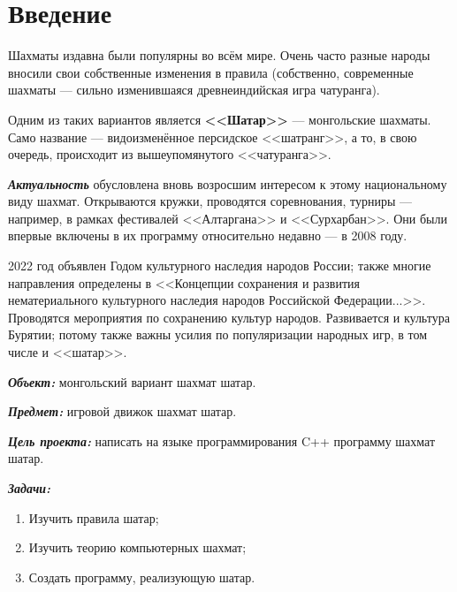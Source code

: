 {
	\chapter*{Введение}
	Шахматы издавна были популярны во всём мире. Очень часто разные народы вносили свои собственные изменения в правила (собственно, современные шахматы --- сильно изменившаяся древнеиндийская игра чатуранга). 
	
	Одним из таких вариантов является \textbf{<<Шатар>>} --- монгольские шахматы. Само название --- видоизменённое персидское <<шатранг>>, а то, в свою очередь, происходит из вышеупомянутого <<чатуранга>>.
	
	\textbf{\textit{Актуальность}} обусловлена вновь возросшим интересом к этому национальному виду шахмат. Открываются кружки, проводятся соревнования, турниры --- например, в рамках фестивалей <<Алтаргана>> и <<Сурхарбан>>. Они были впервые включены в их программу относительно недавно --- в 2008 году.
	
	2022 год  объявлен Годом культурного наследия народов России; также многие направления определены в <<Концепции
	сохранения и развития нематериального культурного наследия народов Российской Федерации...>>. Проводятся мероприятия по сохранению культур народов. Развивается и культура Бурятии; потому  также важны  усилия по популяризации народных игр, в том числе и <<шатар>>.
	
	\textbf{\textit{Объект:}} монгольский вариант шахмат шатар.
	
	\textbf{\textit{Предмет:}} игровой движок шахмат шатар.
	
	\textbf{\textit{Цель проекта:}} написать на языке программирования C++ программу шахмат шатар.
	
	\textbf{\textit{Задачи:}}
	
	\begin{enumerate}
		\item Изучить правила шатар;
		\item Изучить теорию компьютерных шахмат;
		\item Создать программу, реализующую шатар.
	\end{enumerate}
	\clearpage
}